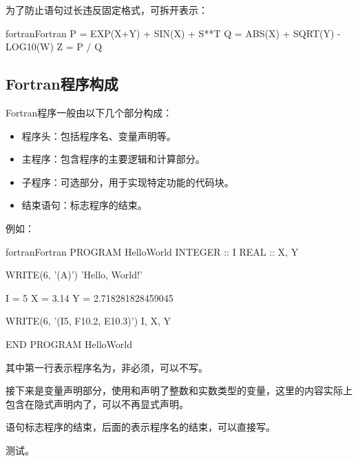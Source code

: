 为了防止语句过长违反固定格式，可拆开表示：
\begin{envcode}{fortran}{Fortran}
      P = EXP(X+Y) + SIN(X) + S**T
      Q = ABS(X) + SQRT(Y) - LOG10(W)
      Z = P / Q
\end{envcode}

\subsection{Fortran程序构成}
Fortran程序一般由以下几个部分构成：
\begin{itemize}
      \item 程序头：包括程序名、变量声明等。
      \item 主程序：包含程序的主要逻辑和计算部分。
      \item 子程序：可选部分，用于实现特定功能的代码块。
      \item 结束语句：标志程序的结束。
\end{itemize}
例如：
\begin{envcode}{fortran}{Fortran}
      PROGRAM HelloWorld
      INTEGER :: I
      REAL :: X, Y
      
      WRITE(6, '(A)') 'Hello, World!'
      
      I = 5
      X = 3.14
      Y = 2.718281828459045
      
      WRITE(6, '(I5, F10.2, E10.3)') I, X, Y
      
      END PROGRAM HelloWorld
\end{envcode}

其中第一行表示程序名为，非必须，可以不写。

接下来是变量声明部分，使用和声明了整数和实数类型的变量，这里的内容实际上包含在隐式声明内了，可以不再显式声明。

语句标志程序的结束，后面的表示程序名的结束，可以直接写。

测试。
